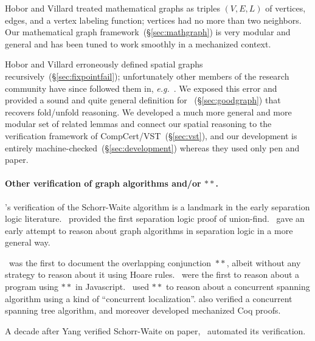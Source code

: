 \iftrue
Hobor and Villard treated mathematical graphs as triples $(V,E,L)$ of
vertices, edges, and a vertex labeling function; vertices had no more than two
neighbors.  Our mathematical graph framework~(\S\ref{sec:mathgraph}) is very
modular and general and has been tuned to work smoothly in a mechanized context.

Hobor and Villard erroneously defined spatial graphs
recursively~(\S\ref{sec:fixpointfail}); unfortunately other members of the research
community have since followed them in, \emph{e.g.}~\cite{raadvg15}.  We exposed this
error and provided a sound and quite general definition for
~(\S\ref{sec:goodgraph}) that recovers fold/unfold reasoning.  We developed a
much more general and more modular set of related lemmas and connect our spatial
reasoning to the verification framework of CompCert/VST~(\S\ref{sec:vst}), and 
our development is entirely
machine-checked~(\S\ref{sec:development}) whereas they used only pen and paper.

\fi

\paragraph{Other verification of graph algorithms and/or $**$.}
\cite{hongseok:phd}'s verification of the Schorr-Waite algorithm is a landmark in the 
early separation logic literature.  \cite{neelthesis}~provided the first separation
logic proof of union-find.  \cite{bornat:aliasing04}~gave an early attempt to
reason about graph algorithms in separation logic in a more general
way.

\cite{rey-slnotes}~was the first to document the overlapping conjunction~$**$, albeit without
any strategy to reason about it using Hoare rules.
\cite{gardnerms12}~were the first to reason about a program using $**$ in
Javascript.  \cite{raadvg15}~used $**$ to reason about a
concurrent spanning algorithm using a kind of
``concurrent localization''.  \cite{ilya-graphs} also verified a
concurrent spanning tree algorithm, and moreover developed mechanized Coq proofs.

A decade after Yang verified Schorr-Waite on paper, \cite{leino10}~automated
its verification.


